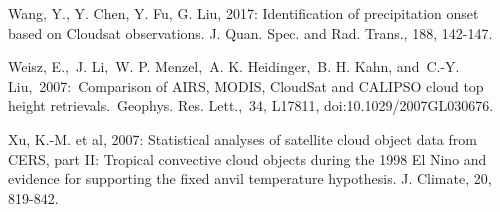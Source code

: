 \documentclass[11pt]{article}
\begin{document}
Wang, Y., Y. Chen, Y. Fu, G. Liu, 2017: Identification of precipitation
onset based on Cloudsat observations. J. Quan. Spec. and Rad. Trans.,
188, 142-147.

Weisz, E.,~J. Li,~W. P. Menzel,~A. K. Heidinger,~B. H. Kahn, and~C.-Y.
Liu,~2007:~Comparison of AIRS, MODIS, CloudSat and CALIPSO cloud top
height retrievals.~Geophys. Res. Lett.,~34, L17811,
doi:10.1029/2007GL030676.

Xu, K.-M. et al, 2007: Statistical analyses of satellite cloud object
data from CERS, part II: Tropical convective cloud objects during the
1998 El Nino and evidence for supporting the fixed anvil temperature
hypothesis. J. Climate, 20, 819-842.


    
    
    
    
\end{document}
